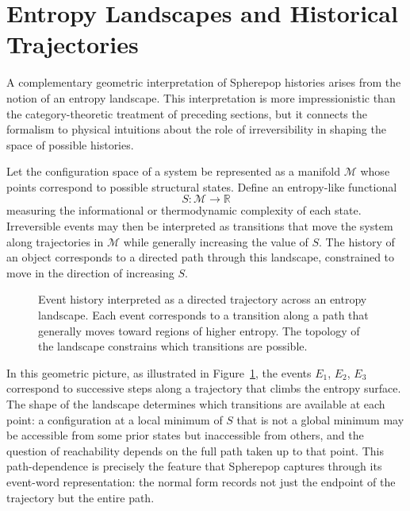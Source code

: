 \documentclass[12pt]{article}
\theoremstyle{plain}
\theoremstyle{definition}
\theoremstyle{remark}
\begin{document}
\section{Entropy Landscapes and Historical Trajectories}
\label{sec:landscape}

A complementary geometric interpretation of Spherepop histories arises from
the notion of an entropy landscape.  This interpretation is more impressionistic
than the category-theoretic treatment of preceding sections, but it connects
the formalism to physical intuitions about the role of irreversibility in
shaping the space of possible histories.

Let the configuration space of a system be represented as a manifold
$\mathcal{M}$ whose points correspond to possible structural states.  Define an
entropy-like functional
\[
  S : \mathcal{M} \rightarrow \mathbb{R}
\]
measuring the informational or thermodynamic complexity of each state.
Irreversible events may then be interpreted as transitions that move the system
along trajectories in $\mathcal{M}$ while generally increasing the value of
$S$.  The history of an object corresponds to a directed path through this
landscape, constrained to move in the direction of increasing $S$.

\begin{figure}[ht]
\centering
{}
\caption{Event history interpreted as a directed trajectory across an entropy
landscape.  Each event corresponds to a transition along a path that generally
moves toward regions of higher entropy.  The topology of the landscape
constrains which transitions are possible.}
\label{fig:landscape}
\end{figure}

In this geometric picture, as illustrated in Figure~\ref{fig:landscape}, the
events $E_1$, $E_2$, $E_3$ correspond to successive steps along a trajectory
that climbs the entropy surface.  The shape of the landscape determines which
transitions are available at each point: a configuration at a local minimum of
$S$ that is not a global minimum may be accessible from some prior states but
inaccessible from others, and the question of reachability depends on the
full path taken up to that point.  This path-dependence is precisely the
feature that Spherepop captures through its event-word representation: the
normal form records not just the endpoint of the trajectory but the entire
path.
\end{document}
